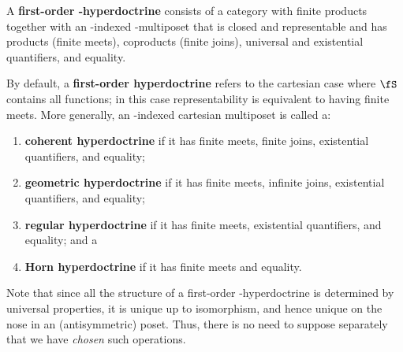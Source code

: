 \begin{defn}
  A \textbf{first-order \fS-hyperdoctrine} consists of a category \cS with finite products together with an \cS-indexed \fS-multiposet that is closed and representable and has products (finite meets), coproducts (finite joins), universal and existential quantifiers, and equality.

  By default, a \textbf{first-order hyperdoctrine} refers to the cartesian case where $\fS$ contains all functions; in this case representability is equivalent to having finite meets.
  More generally, an \cS-indexed cartesian multiposet is called a:
  \begin{enumerate}
  \item \textbf{coherent hyperdoctrine} if it has finite meets, finite joins, existential quantifiers, and equality;
  \item \textbf{geometric hyperdoctrine} if it has finite meets, infinite joins, existential quantifiers, and equality;
  \item \textbf{regular hyperdoctrine} if it has finite meets, existential quantifiers, and equality; and a
  \item \textbf{Horn hyperdoctrine} if it has finite meets and equality.
  \end{enumerate}
\end{defn}

Note that since all the structure of a first-order \fS-hyperdoctrine is determined by universal properties, it is unique up to isomorphism, and hence unique on the nose in an (antisymmetric) poset.
Thus, there is no need to suppose separately that we have \emph{chosen} such operations.

